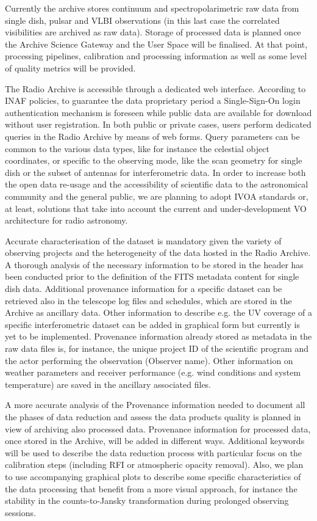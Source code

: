 \documentclass[11pt,a4paper]{ivoatex/ivoa}
\begin{document}
Currently the archive stores continuum and spectropolarimetric raw data from single dish, pulsar and 
VLBI observations (in this last case the correlated visibilities are archived as raw data). Storage of 
processed data is planned once the Archive Science Gateway and the User Space will be finalised. At that 
point, processing pipelines, calibration and processing information as well as some level of quality 
metrics will be provided.

The Radio Archive is accessible through a dedicated web interface. According to INAF policies, to 
guarantee the data proprietary period a Single-Sign-On login authentication mechanism is foreseen while 
public data are available for download without user registration. In both public or private cases, users 
perform dedicated queries in the Radio Archive by means of web forms. Query parameters can be common to 
the various data types, like for instance the celestial object coordinates, or specific to the observing 
mode, like the scan geometry for single dish or the subset of antennas for interferometric data. In 
order to increase both the open data re-usage and the accessibility of scientific data to the 
astronomical community and the general public, we are planning to adopt IVOA standards or, at least, 
solutions that take into account the current and under-development VO architecture for radio astronomy.

Accurate characterisation of the dataset is mandatory given the variety of observing projects and the 
heterogeneity of the data hosted in the Radio Archive. A thorough analysis of the necessary information 
to be stored in the header has been conducted prior to the definition of the FITS metadata content for 
single dish data. Additional provenance information for a specific dataset can be retrieved also in the 
telescope log files and schedules, which are stored in the Archive as ancillary data. Other information 
to describe e.g. the UV coverage of a specific interferometric dataset can be added in graphical form 
but currently is yet to be implemented. Provenance information already stored as metadata in the raw 
data files is, for instance, the unique project ID of the scientific program and the actor performing 
the observation (Observer name). Other information on weather parameters and receiver performance (e.g. 
wind conditions and system temperature) are saved in the ancillary associated files.

A more accurate analysis of the Provenance information needed to document all the phases of data 
reduction and assess the data products quality is planned in view of archiving also processed data.  
Provenance information for processed data, once stored in the Archive, will be added in different ways. 
Additional keywords will be used to describe the data reduction process with particular focus on the 
calibration steps (including RFI or atmospheric opacity removal). Also, we plan to use accompanying 
graphical plots to describe some specific characteristics of the data processing that benefit from a 
more visual approach, for instance the stability in the counts-to-Jansky transformation during prolonged 
observing sessions.
\end{document}
